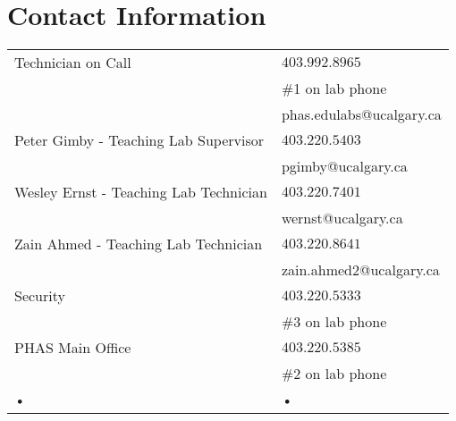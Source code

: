 \documentclass{../../../assets/LabArx1_5} 	%
\begin{document}
\section*{Contact Information}
\begin{table}[h!]
\centering
\begin{tabular}{|l|l|}

\hline 
Technician on Call  & $403.992.8965$ \\ 
& \#1 on lab phone\\
& phas.edulabs@ucalgary.ca\\
\hline 
Peter Gimby - Teaching Lab Supervisor & $403.220.5403$ \\ 
& pgimby@ucalgary.ca \\
\hline 
Wesley Ernst - Teaching Lab Technician & $403.220.7401$ \\ 
& wernst@ucalgary.ca \\ 
\hline
Zain Ahmed - Teaching Lab Technician & $403.220.8641$ \\ 
&zain.ahmed2@ucalgary.ca\\
\hline 
Security & $403.220.5333$ \\ 
& \#3 on lab phone\\
\hline 
PHAS Main Office &  $403.220.5385$ \\ 
& \#2 on lab phone\\
\hline 
• & • \\ 
\hline 
\end{tabular} 
\end{table}
\end{document}
